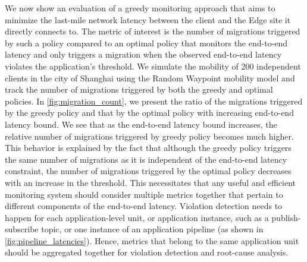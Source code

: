 \par We now show an evaluation of a greedy monitoring approach that aims to minimize the last-mile network latency between the client and the Edge site it directly connects to. The metric of interest is the number of migrations triggered by such a policy compared to an optimal policy that monitors the end-to-end latency and only triggers a migration when the observed end-to-end latency violates the application's threshold. We simulate the mobility of 200 independent clients in the city of Shanghai using the Random Waypoint mobility model and track the number of migrations triggered by both the greedy and optimal policies. In \cref{fig:migration_count}, we present the ratio of the migrations triggered by the greedy policy and that by the optimal policy with increasing end-to-end latency bound. We see that as the end-to-end latency bound increases, the relative number of migrations triggered by greedy policy becomes much higher. This behavior is explained by the fact that although the greedy policy triggers the same number of migrations as it is independent of the end-to-end latency constraint, the number of migrations triggered by the optimal policy decreases with an increase in the threshold. This necessitates that any useful and efficient monitoring system should consider multiple metrics together that pertain to different components of the end-to-end latency. Violation detection needs to happen for each application-level unit, or application instance, such as a publish-subscribe topic, or one instance of an application pipeline (as shown in \cref{fig:pipeline_latencies}). Hence, metrics that belong to the same application unit should be aggregated together for violation detection and root-cause analysis.

